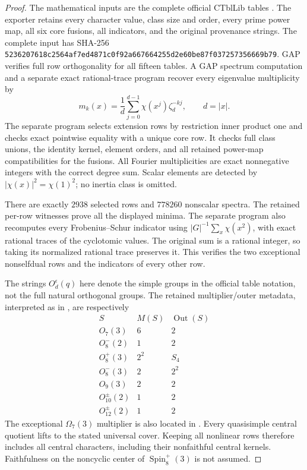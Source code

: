 \begin{proof}
The mathematical inputs are the complete official CTblLib tables
\cite{HD:OrthogonalSmallTables}. The exporter retains every character
value, class size and order, every prime power map, all six core
fusions, all indicators, and the original provenance strings.
The complete input has SHA-256
\texttt{5236207618c2564af7ed4871c0f92a667664255d2e60be87f037257356669b79}.
GAP verifies full row orthogonality for all fifteen tables. A GAP
spectrum computation and a separate exact rational-trace program
recover every eigenvalue multiplicity by
\[
 m_k(x)=\frac1d\sum_{j=0}^{d-1}\chi(x^j)\zeta_d^{-kj},
 \qquad d=|x|.                                                \tag{OSM.2}
\]
The separate program selects extension rows by restriction inner
product one and checks exact pointwise equality with a unique core
row. It checks full class unions, the identity kernel, element orders,
and all retained power-map compatibilities for the fusions. All
Fourier multiplicities are exact nonnegative integers with the
correct degree sum. Scalar elements are detected by
$|\chi(x)|^2=\chi(1)^2$; no inertia class is omitted.

There are exactly $2938$ selected rows and $778260$ nonscalar spectra.
The retained per-row witnesses prove all the displayed minima.
The separate program also recomputes every Frobenius--Schur indicator
using $|G|^{-1}\sum_x\chi(x^2)$, with exact rational traces of the
cyclotomic values. The original sum is a rational integer, so taking
its normalized rational trace preserves it. This verifies the two
exceptional nonselfdual rows and the indicators of every other row.

The strings $O_d^\epsilon(q)$ here denote the simple groups in the
official table notation, not the full natural orthogonal groups.
The retained multiplier/outer metadata, interpreted as in
\cite[\S3.7-3]{HD:OrthogonalSmallTables}, are respectively
\[
\begin{array}{c|c|c}
S&M(S)&\operatorname{Out}(S)\\\hline
O_7(3)&6&2\\
O_8^-(2)&1&2\\
O_8^+(3)&2^2&S_4\\
O_8^-(3)&2&2^2\\
O_9(3)&2&2\\
O_{10}^{\pm}(2)&1&2\\
O_{12}^{\pm}(2)&1&2
\end{array}                                                     \tag{OSM.3}
\]
The exceptional $\Omega_7(3)$ multiplier is also located in
\cite[Chapter~5, Table~1 and preceding paragraph, p.~35]{BI:HHM}.
Every quasisimple central quotient lifts to the stated universal cover.
Keeping all nonlinear rows therefore includes all central characters,
including their nonfaithful central kernels. Faithfulness on the
noncyclic center of $\operatorname{Spin}_8^+(3)$ is not assumed.
\end{proof}

